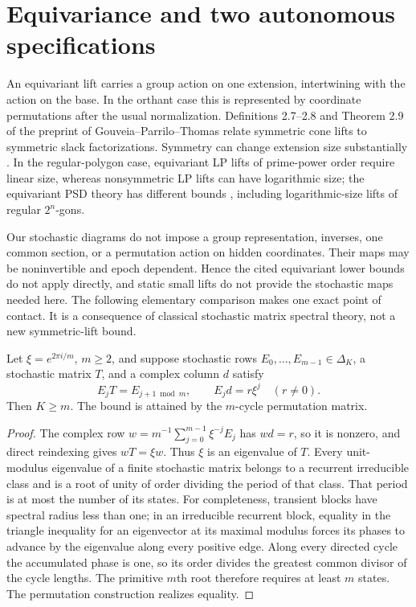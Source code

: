 \section{Equivariance and two autonomous specifications}\label{sec:symmetry34}
An equivariant lift carries a group action on one extension, intertwining
with the action on the base. In the orthant case this is represented by
coordinate permutations after the usual normalization. Definitions 2.7--2.8
and Theorem 2.9 of the preprint of Gouveia--Parrilo--Thomas \cite{GPT}
relate symmetric cone lifts to symmetric slack factorizations. Symmetry
can change extension size substantially \cite{KPT}. In the regular-polygon
case, equivariant LP lifts of prime-power order require linear size,
whereas nonsymmetric LP lifts can have logarithmic size; the equivariant
PSD theory has different bounds \cite{FSP}, including logarithmic-size
lifts of regular $2^n$-gons.

Our stochastic diagrams do not impose a group representation, inverses,
one common section, or a permutation action on hidden coordinates. Their
maps may be noninvertible and epoch dependent. Hence the cited equivariant
lower bounds do not apply directly, and static small lifts do not provide
the stochastic maps needed here. The following elementary comparison makes
one exact point of contact. It is a consequence of classical stochastic
matrix spectral theory, not a new symmetric-lift bound.

\begin{proposition}\label{prop:cyclic34}
Let $\xi=e^{2\pi i/m}$, $m\ge2$, and suppose stochastic rows
$E_0,\ldots,E_{m-1}\in\Delta_K$, a stochastic matrix $T$, and a complex
column $d$ satisfy
\[
 E_jT=E_{j+1\bmod m},\qquad E_jd=r\xi^j\quad(r\ne0).
\]
Then $K\ge m$. The bound is attained by the $m$-cycle permutation matrix.
\end{proposition}
\begin{proof}
The complex row $w=m^{-1}\sum_{j=0}^{m-1}\xi^{-j}E_j$ has $wd=r$,
so it is nonzero, and direct reindexing gives $wT=\xi w$.
Thus $\xi$ is an eigenvalue of $T$. Every unit-modulus eigenvalue of a
finite stochastic matrix belongs to a recurrent irreducible class and is
a root of unity of order dividing the period of that class. That period
is at most the number of its states. For completeness, transient blocks
have spectral radius less than one; in an irreducible recurrent block,
equality in the triangle inequality for an eigenvector at its maximal
modulus forces its phases to advance by the eigenvalue along every
positive edge. Along every directed cycle the accumulated phase is one,
so its order divides the greatest common divisor of the cycle lengths.
The primitive $m$th root therefore requires at least $m$ states.
The permutation construction realizes equality.
\end{proof}

